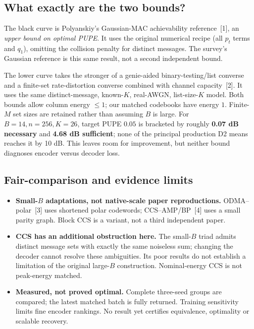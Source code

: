 \documentclass[10pt,a4paper]{article}
\begin{document}
\subsection{What exactly are the two bounds?}
The black curve is Polyanskiy's Gaussian-MAC achievability reference~[1], an \emph{upper bound on optimal PUPE}.
It uses the original numerical recipe (all $p_t$ terms and $q_1$), omitting the collision penalty for distinct messages.
The survey's Gaussian reference is this same result, not a second independent bound.

The lower curve takes the stronger of a genie-aided binary-testing/list converse and a finite-set
rate-distortion converse combined with channel capacity~[2]. It uses the same distinct-message, known-$K$,
real-AWGN, list-size-$K$ model. Both bounds allow column energy $\leq1$; our matched codebooks have energy $1$.
Finite-$M$ set sizes are retained rather than assuming $B$ is large.
For $B=14,n=256,K=26$, target PUPE $0.05$ is bracketed by roughly \textbf{0.07 dB necessary} and
\textbf{4.68 dB sufficient}; none of the principal production D2 means reaches it by 10 dB.
This leaves room for improvement, but neither bound diagnoses encoder versus decoder loss.

\subsection{Fair-comparison and evidence limits}
\begin{itemize}
 \item \textbf{Small-$B$ adaptations, not native-scale paper reproductions.} ODMA--polar~[3] uses shortened polar
 codewords; CCS--AMP/BP~[4] uses a small parity graph. Block CCS is a variant, not a third independent paper.
 \item \textbf{CCS has an additional obstruction here.} The small-$B$ triad admits distinct message sets with exactly
 the same noiseless sum; changing the decoder cannot resolve these ambiguities. Its poor results do not establish a
 limitation of the original large-$B$ construction. Nominal-energy CCS is not peak-energy matched.
 \item \textbf{Measured, not proved optimal.} Complete three-seed groups are compared; the latest matched batch is
 fully returned. Training sensitivity limits fine encoder rankings. No result yet certifies equivalence, optimality
 or scalable recovery.
\end{itemize}
\end{document}
